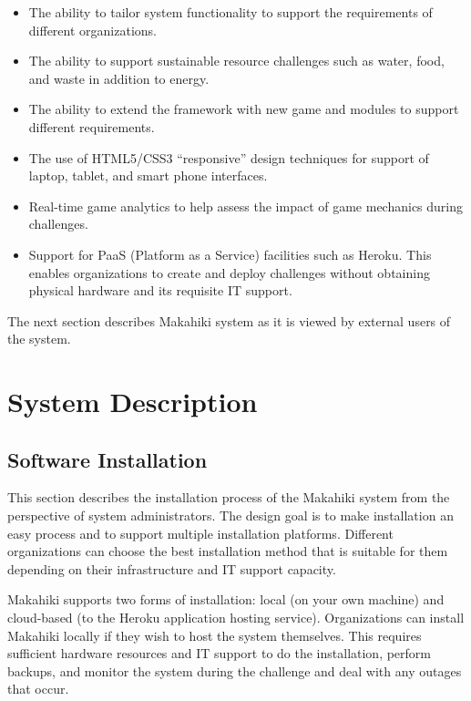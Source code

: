 \begin{itemize}
\item The ability to tailor system functionality to support the requirements of different organizations.
\item The ability to support sustainable resource challenges such as water, food, and waste in addition to energy.
\item The ability to extend the framework with new game and modules to support different requirements.
\item The use of HTML5/CSS3 ``responsive'' design techniques for support of laptop, tablet, and smart phone interfaces.
\item Real-time game analytics to help assess the impact of game mechanics during challenges.
\item Support for PaaS (Platform as a Service) facilities such as Heroku. This enables organizations to create and deploy challenges without obtaining physical hardware and its requisite IT support.
\end{itemize}

The next section describes Makahiki system as it is viewed by external users of the system.

\section{System Description}
\label{sec:makahiki-design-description}

\subsection{Software Installation}

This section describes the installation process of the Makahiki system from the perspective of system administrators. The design goal is to make installation an easy process and to support multiple installation platforms. Different organizations can choose the best installation method that is suitable for them depending on their infrastructure and IT support capacity. 

Makahiki supports two forms of installation: local (on your own machine) and cloud-based (to the Heroku application hosting service). Organizations can install Makahiki locally if they wish to host the system themselves. This requires sufficient hardware resources and IT support to do the installation, perform backups, and monitor the system during the challenge and deal with any outages that occur.

